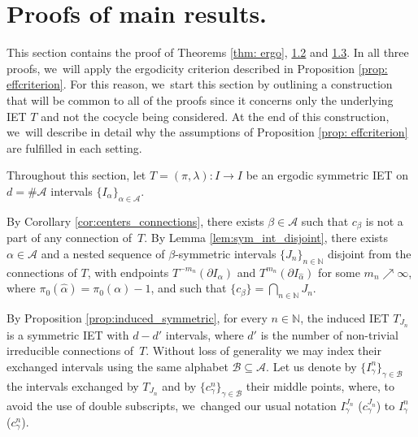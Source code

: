 \documentclass[10pt,a4paper]{amsart}
\theoremstyle{plain}
\theoremstyle{definition}
\newcommand{\A}{\mathcal{A}}
\newcommand{\B}{\mathcal{B}}
\newcommand{\N}{\mathbb{N}}
\begin{document}
\section{Proofs of main results.}

This section contains the proof of Theorems \ref{thm: ergo}, \href{https://jep.centre-mersenne.org/item/10.5802/jep.302.pdf#page=4}{1.2} and \href{https://jep.centre-mersenne.org/item/10.5802/jep.302.pdf#page=5}{1.3}. In all three proofs, we~will apply the ergodicity criterion described in Proposition \ref{prop: effcriterion}. For this reason, we~start this section by outlining a construction that will be common to all of the proofs since it concerns only the underlying IET $T$ and not the cocycle being considered. At the end of this construction, we~will describe in detail why the assumptions of Proposition \ref{prop: effcriterion} are fulfilled in each setting.

Throughout this section, let $T=(\pi,\lambda): I \to I$ be an ergodic symmetric IET on $d = \#\A$ intervals $\{I_\alpha\}_{\alpha \in \A}$.

By Corollary \ref{cor:centers_connections}, there exists $\beta \in \A$ such that $c_{\beta}$ is not a part of any connection of~$T$. By Lemma \ref{lem:sym_int_disjoint}, there exists $\alpha \in \A$ and a nested sequence of $\beta$-symmetric intervals $\{J_n\}_{n \in \N}$ disjoint from the connections of $T$, with endpoints $T^{-m_n}(\partial I_{\alpha})$ and $T^{m_n}(\partial I_{\hat\alpha})$ for some $m_n \nearrow \infty$, where $\pi_0(\hat\alpha) = \pi_0(\alpha)-1$, and such that $\{c_\beta\} = \bigcap_{n \in \N} J_n$.

By Proposition \ref{prop:induced_symmetric}, for every $n\in\N$, the induced IET $T_{J_n}$ is a symmetric IET with $d - d'$ intervals, where $d'$ is the number of non-trivial irreducible connections of~$T$. Without loss of generality we may index their exchanged intervals using the same alphabet $\B \subseteq \A$. Let us denote by $\{I_\gamma^n\}_{\gamma \in \B}$ the intervals exchanged by $T_{J_n}$ and by $\{c_\gamma^n\}_{\gamma \in \B}$ their middle points, where, to avoid the use of double subscripts, we~changed our usual notation $I_\gamma^{J_n}$ (\resp $c_\gamma^{J_n}$) to $I_\gamma^n$ (\resp $c_\gamma^n$).
\end{document}
